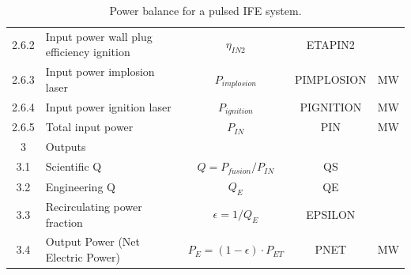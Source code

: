 \begin{table}[ht!]
\begin{tabular}{|c|p{5cm}|c|c|c|}
2.6.2	& Input power wall plug efficiency ignition &	$\eta_{IN2}$& ETAPIN2	&	\\
2.6.3	& Input power implosion laser	& $P_{implosion}$	&	PIMPLOSION	&	MW \\
2.6.4	& Input power ignition laser	& $P_{ignition}$	&	PIGNITION	&	MW \\
2.6.5	& Total input power	& $P_{IN}$	&	PIN	&	MW \\
\hline								
3	&	Outputs	&		&		&	\\
\hline
3.1	&	Scientific Q	&	$Q = P_{{fusion}}/P_{{IN}}$	&	QS	&	\\
3.2	&	Engineering Q	&	$Q_{{E}}$	&	QE	&	\\
3.3	&	Recirculating power fraction	&	$\epsilon = 1/Q_{{E}}$	&	EPSILON	&	\\
3.4	&	Output Power (Net Electric Power)	&	$P_{{E}} = (1 - \epsilon) \cdot P_{{ET}}$	&	PNET	&	MW \\
\hline								
\end{tabular}	
\caption{Power balance for a pulsed IFE system.}
\label{tab:powerbalance}
\end{table}
